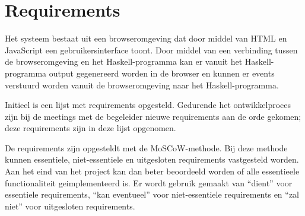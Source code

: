 \chapter{Requirements} \label{hoofdstuk:requirements}


Het systeem bestaat uit een browseromgeving dat door middel van HTML en JavaScript een gebruikersinterface toont. Door middel van een verbinding tussen de browseromgeving en het Haskell-programma kan er vanuit het Haskell-programma output gegenereerd worden in de browser en kunnen er events verstuurd worden vanuit de browseromgeving naar het Haskell-programma.

Initieel is een lijst met requirements opgesteld. Gedurende het ontwikkelproces zijn bij de meetings met de begeleider nieuwe requirements aan de orde gekomen; deze requirements zijn in deze lijst opgenomen.

De requirements zijn opgesteldt met de MoSCoW-methode. Bij deze methode kunnen essentiele, niet-essentiele en uitgesloten requirements vastgesteld worden. Aan het eind van het project kan dan beter beoordeeld worden of alle essentieele functionaliteit geimplementeerd is.  Er wordt gebruik gemaakt van ``dient'' voor essentiele requirements, ``kan eventueel'' voor niet-essentiele requirements en ``zal niet'' voor uitgesloten requirements.


